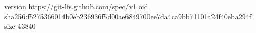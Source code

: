 version https://git-lfs.github.com/spec/v1
oid sha256:f5275366014b0eb236936f5d00ae6849700ee7da4ca9bb71101a24f40eba294f
size 43840

